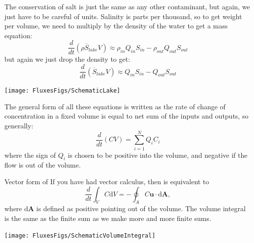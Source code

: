 The conservation of salt is just the same as any other contaminant, but again, we just have to be careful of units.  Salinity is parts per thousand, so to get weight per volume, we need to multiply by the density of the water to get a mass equation:
\begin{equation}
    \frac{d}{dt}\left(\rho \overline{S}_{lake} V\right) \approx \rho_{in} Q_{in} S_{in} - \rho_{out}Q_{out}S_{out} 
\end{equation}
but again we just drop the density to get:
\begin{equation}
    \frac{d}{dt}\left(\overline{S}_{lake} V\right) \approx Q_{in} S_{in} - Q_{out}S_{out} 
\end{equation}

\begin{marginfigure}
    \texttt{[image: FluxesFigs/SchematicLake]}
    \caption{Schematic of lake with 5 possible inlets.  If $Q_i<0$ that means the flow is out of the lake.   }
\end{marginfigure}

The general form of all these equations is written as the rate of change of concentration in a fixed volume is equal to net sum of the inputs and outputs, so generally:
\begin{equation}
    \label{eq:sumMassCon}
    \frac{d}{dt}\left(C V\right) = \sum_{i=1}^N Q_{i} C_{i}
\end{equation}
where the sign of $Q_i$ is chosen to be positive into the volume, and negative if the flow is out of the volume.  



\begin{derivbox}[label={box:volumeintegral}]{Vector form of }
    If you have had vector calculus, then  is equivalent to 
    \begin{equation}
        \frac{d}{dt}\int_V C \mathrm{d}V = - \oint_A C \mathbf{u}\cdot \mathrm{d}\mathbf{A},
    \end{equation} 
    where $\mathrm{d}\mathbf{A}$ is defined as positive pointing out of the volume.  The volume integral is the same as the finite sum as we make more and more finite sums.  
\end{derivbox}

\begin{marginfigure}
    \texttt{[image: FluxesFigs/SchematicVolumeIntegral]}
    \caption{Schematic of volume integral.  The total integral is the sum of all ``open'' faces of the area that bounds the lake (i.e. you can only have fluxes out the open sides of the lake).}
\end{marginfigure}






